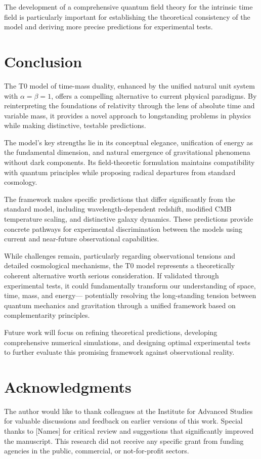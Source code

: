 \documentclass[12pt,a4paper]{article} %
\newenvironment{acknowledgments}
{\section*{Acknowledgments}}
{\vspace{1em}}
\begin{document}
	The development of a comprehensive quantum field theory
	for the intrinsic time field
	is particularly important for establishing the theoretical consistency of the model
	and deriving more precise predictions for experimental tests.
	
	\section{Conclusion}
	\label{sec:conclusion}
	
	The T0 model of time-mass duality,
	enhanced by the unified natural unit system with $\alpha = \beta = 1$,
	offers a compelling alternative to current physical paradigms. 
	By reinterpreting the foundations of relativity
	through the lens of absolute time and variable mass,
	it provides a novel approach to longstanding problems in physics
	while making distinctive, testable predictions.
	
	The model's key strengths lie in its conceptual elegance,
	unification of energy as the fundamental dimension,
	and natural emergence of gravitational phenomena without dark components. 
	Its field-theoretic formulation maintains compatibility with quantum principles
	while proposing radical departures from standard cosmology.
	
	The framework makes specific predictions
	that differ significantly from the standard model,
	including wavelength-dependent redshift,
	modified CMB temperature scaling,
	and distinctive galaxy dynamics. 
	These predictions provide concrete pathways
	for experimental discrimination between the models
	using current and near-future observational capabilities.
	
	While challenges remain,
	particularly regarding observational tensions and detailed cosmological mechanisms,
	the T0 model represents a theoretically coherent alternative
	worth serious consideration. 
	If validated through experimental tests,
	it could fundamentally transform our understanding
	of space, time, mass, and energy—
	potentially resolving the long-standing tension
	between quantum mechanics and gravitation
	through a unified framework based on complementarity principles.
	
	Future work will focus on refining theoretical predictions,
	developing comprehensive numerical simulations,
	and designing optimal experimental tests
	to further evaluate this promising framework against observational reality.
	
	\begin{acknowledgments}
		The author would like to thank colleagues
		at the Institute for Advanced Studies
		for valuable discussions and feedback
		on earlier versions of this work. 
		Special thanks to [Names]
		for critical review and suggestions
		that significantly improved the manuscript. 
		This research did not receive any specific grant
		from funding agencies in the public, commercial,
		or not-for-profit sectors.
	\end{acknowledgments}
	
\end{document}
